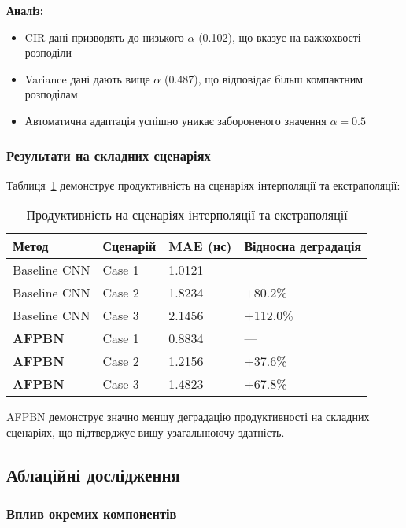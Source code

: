 \documentclass[12pt,a4paper]{article}
\begin{document}
\textbf{Аналіз:}
\begin{itemize}
	\item CIR дані призводять до низького $\alpha$ (0.102), що вказує на важкохвості розподіли
	\item Variance дані дають вище $\alpha$ (0.487), що відповідає більш компактним розподілам
	\item Автоматична адаптація успішно уникає забороненого значення $\alpha = 0.5$
\end{itemize}

\subsubsection{Результати на складних сценаріях}

Таблиця~\ref{tab:complex_scenarios} демонструє продуктивність на сценаріях інтерполяції та екстраполяції:

\begin{table}[htbp]
	\centering
	\caption{Продуктивність на сценаріях інтерполяції та екстраполяції}
	\label{tab:complex_scenarios}
	\begin{tabular}{@{}llll@{}}
		\toprule
		\textbf{Метод} & \textbf{Сценарій} & \textbf{MAE (нс)} & \textbf{Відносна деградація} \\
		\midrule
		Baseline CNN & Case 1 & 1.0121 & — \\
		Baseline CNN & Case 2 & 1.8234 & +80.2\% \\
		Baseline CNN & Case 3 & 2.1456 & +112.0\% \\
		\midrule
		\textbf{AFPBN} & Case 1 & 0.8834 & — \\
		\textbf{AFPBN} & Case 2 & 1.2156 & +37.6\% \\
		\textbf{AFPBN} & Case 3 & 1.4823 & +67.8\% \\
		\bottomrule
	\end{tabular}
\end{table}

AFPBN демонструє значно меншу деградацію продуктивності на складних сценаріях, що підтверджує вищу узагальнюючу здатність.

\subsection{Аблаційні дослідження}

\subsubsection{Вплив окремих компонентів}
\end{document}
